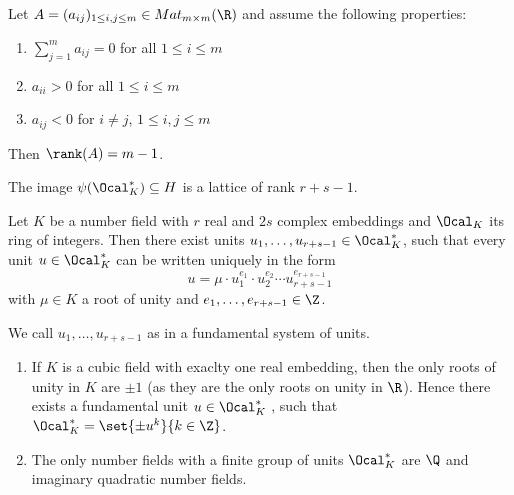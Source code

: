 \begin{lem}
	Let \( A = (a_{ij})_{1 \leq i,j \leq m} \in Mat_{m \times m}(\R) \) and assume the following properties:
	\begin{enumerate}[label=(\roman*)]
		\item \( \sum_{j=1}^m a_{ij} = 0 \) for all \( 1 \leq i \leq m \)
		\item \( a_{ii} > 0 \) for all \( 1 \leq i \leq m \)
		\item \( a_{ij} < 0 \) for \( i \neq j \), \( 1 \leq i,j \leq m \)
	\end{enumerate}
	Then \( \rank(A) = m-1 \).
\end{lem}

\begin{cor}
	The image \( \psi(\Ocal_K^*) \subseteq H \) is a lattice of rank \( r+s-1 \).
\end{cor}

\begin{thmn}\label{thm:3.33}
	Let \( K \) be a number field with \( r \) real and \( 2s \) complex embeddings and \( \Ocal_K \) its ring of integers.
	Then there exist units \( u_1, \dotsc, u_{r+s-1} \in \Ocal_K^* \), such that every unit \( u \in \Ocal_K^* \) can be written uniquely in the form
	\[ u = \mu \cdot u_1^{e_1} \cdot u_2^{e_2} \dotsm u_{r+s-1}^{e_{r+s-1}} \]
	with \( \mu \in K \) a root of unity and \( e_1, \dotsc, e_{r+s-1} \in \Z \).
\end{thmn}

\begin{rem*}
	We call \( u_1, \dotsc, u_{r+s-1} \) as in  a fundamental system of units.
\end{rem*}

\begin{exmp*}
	\begin{enumerate}
		\item If \( K \) is a cubic field with exaclty one real embedding, then the only roots of unity in \( K \) are \( \pm 1 \) (as they are the only roots on unity in \( \R \)).
			Hence there exists a fundamental unit \( u \in \Ocal_K^* \) , such that \( \Ocal_K^* = \set{\pm u^k}{k \in \Z} \).
		\item The only number fields with a finite group of units \( \Ocal_K^* \) are \( \Q \) and imaginary quadratic number fields.
	\end{enumerate}
\end{exmp*}